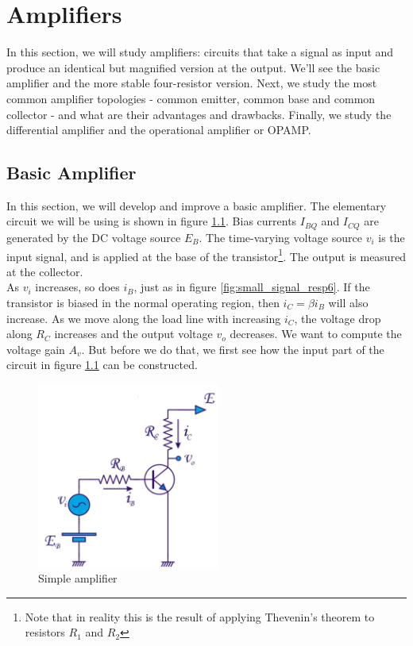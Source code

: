 \chapter{Amplifiers}

In this section, we will study amplifiers: circuits that take a signal as input and produce an identical but magnified version at the output. We'll see the basic amplifier and the more stable four-resistor version. Next, we study the most common amplifier topologies - common emitter, common base and common collector - and what are their advantages and drawbacks. Finally, we study the differential amplifier and the operational amplifier or OPAMP.


\section{Basic Amplifier}
In this section, we will develop and improve a basic amplifier. The elementary circuit we will be using is shown in figure \ref{fig:amplifier0}. Bias currents $I_{BQ}$ and $I_{CQ}$ are generated by the DC voltage source $E_B$.  The time-varying voltage source $v_i$ is the input signal, and is applied at the base of the transistor\footnote{Note that in reality this is the result of applying Thevenin's theorem to resistors $R_1$ and $R_2$}. The output is measured at the collector.\\
As $v_i$ increases, so does $i_B$, just as in figure \ref{fig:small_signal_resp6}. If the transistor is biased in the normal operating region, then $i_C = \beta i_B$ will also increase. As we move along the load line with increasing $i_C$, the voltage drop along $R_C$ increases and the output voltage $v_o$ decreases. We want to compute the voltage gain $A_v$. But before we do that, we first see how the input part of the circuit in figure \ref{fig:amplifier0} can be constructed.
\begin{figure}[h!]
	\centering
	\includegraphics[width=6cm]{figures/ch02/amplifier0.jpg}
	\caption{Simple amplifier}
	\label{fig:amplifier0}
\end{figure}
